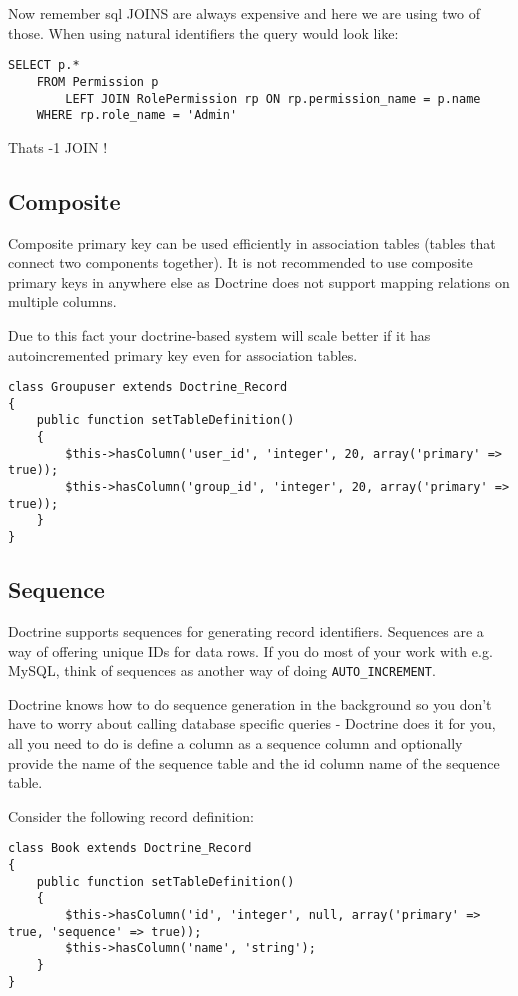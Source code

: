 \documentclass[11pt,a4paper]{report}
\begin{document}
Now remember sql JOINS are always expensive and here we are using two of those. When using natural identifiers the query would look like:

\begin{verbatim}
SELECT p.*
    FROM Permission p
        LEFT JOIN RolePermission rp ON rp.permission_name = p.name
    WHERE rp.role_name = 'Admin'
\end{verbatim}

Thats -1 JOIN !

\subsection{Composite}
Composite primary key can be used efficiently in association tables (tables that connect two components together). It is not recommended to use composite primary keys in anywhere else as Doctrine does not support mapping relations on multiple columns.

Due to this fact your doctrine-based system will scale better if it has autoincremented primary key even for association tables.

\begin{verbatim}
class Groupuser extends Doctrine_Record
{
    public function setTableDefinition()
    {
        $this->hasColumn('user_id', 'integer', 20, array('primary' => true));
        $this->hasColumn('group_id', 'integer', 20, array('primary' => true));
    }
}
\end{verbatim}

\subsection{Sequence}
Doctrine supports sequences for generating record identifiers. Sequences are a way of offering unique IDs for data rows. If you do most of your work with e.g. MySQL, think of sequences as another way of doing \texttt{AUTO\_INCREMENT}.

Doctrine knows how to do sequence generation in the background so you don't have to worry about calling database specific queries - Doctrine does it for you, all you need to do is define a column as a sequence column and optionally provide the name of the sequence table and the id column name of the sequence table.

Consider the following record definition:

\begin{verbatim}
class Book extends Doctrine_Record
{
    public function setTableDefinition()
    {
        $this->hasColumn('id', 'integer', null, array('primary' => true, 'sequence' => true));
        $this->hasColumn('name', 'string');
    }
}
\end{verbatim}
\end{document}
